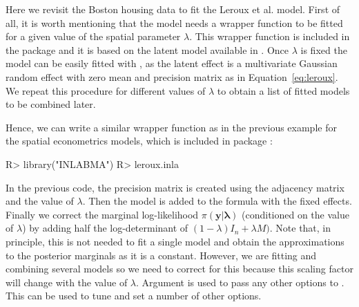 \documentclass[article]{jss}
\begin{document}
Here we revisit the Boston housing data to fit the Leroux et al. model.  First
of all, it is worth mentioning that the model needs a wrapper function to be
fitted for a given value of the spatial parameter $\lambda$. This wrapper
function is included in the  package  and it is based
on the  latent model available in  .  Once $\lambda$
is fixed the model can be easily fitted with , as the latent effect
is a multivariate Gaussian random effect with zero mean and precision matrix as
in Equation~\ref{eq:leroux}.  We repeat this procedure for different values of
$\lambda$ to obtain a list of fitted models to be combined later.

Hence, we can write a similar wrapper function as in the previous example for
the spatial econometrics models, which is included in package :

\begin{Schunk}
\begin{Sinput}
R> library("INLABMA")
R> leroux.inla
\end{Sinput}
\end{Schunk}


In the previous code, the precision matrix  is created using the adjacency
matrix and the value of $\lambda$. Then the  model is added to the
formula with the fixed effects. Finally we correct the marginal log-likelihood
$\pi(\mathbf{y|\lambda})$ (conditioned on the value of $\lambda$) by adding half the log-determinant of $(1-\lambda)I_n+\lambda M)$.
Note that, in principle, this is not needed to fit a single model and obtain
the approximations to the posterior marginals as it is a constant. However, we
are fitting and combining several models so we need to correct for this
because this scaling factor will change with the value of $\lambda$.
Argument  is used to pass any other options to . 
This can be used to tune and set a number of other options.
\end{document}
